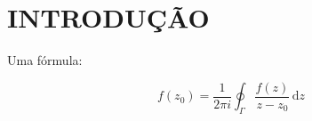 \section*{INTRODUÇÃO}

\lipsum[2]

Uma fórmula:

\[
  f(z_0) = \frac{1}{2 \pi i} \oint_{\Gamma} \frac{f(z)}{z - z_0}\, \mathrm{d}z
\]

\lipsum[1-4]
